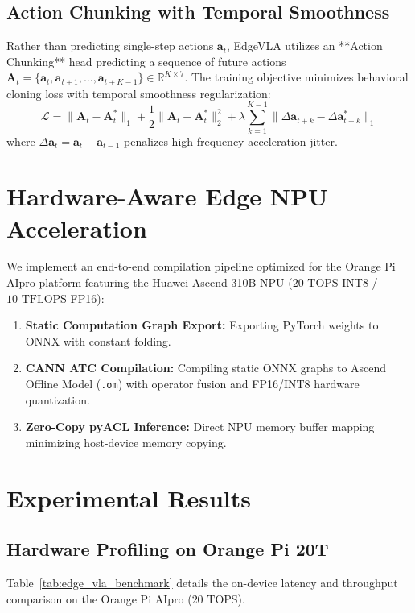 \documentclass[lettersize,journal]{IEEEtran}
\begin{document}
\subsection{Action Chunking with Temporal Smoothness}
Rather than predicting single-step actions $\mathbf{a}_t$, EdgeVLA utilizes an **Action Chunking** head predicting a sequence of future actions $\mathbf{A}_t = \{\mathbf{a}_t, \mathbf{a}_{t+1}, \dots, \mathbf{a}_{t+K-1}\} \in \mathbb{R}^{K \times 7}$. The training objective minimizes behavioral cloning loss with temporal smoothness regularization:
\begin{equation}
\mathcal{L} = \|\mathbf{A}_t - \mathbf{A}_t^*\|_1 + \frac{1}{2}\|\mathbf{A}_t - \mathbf{A}_t^*\|_2^2 + \lambda \sum_{k=1}^{K-1} \|\Delta \mathbf{a}_{t+k} - \Delta \mathbf{a}_{t+k}^*\|_1
\end{equation}
where $\Delta \mathbf{a}_t = \mathbf{a}_{t} - \mathbf{a}_{t-1}$ penalizes high-frequency acceleration jitter.

\section{Hardware-Aware Edge NPU Acceleration}
We implement an end-to-end compilation pipeline optimized for the Orange Pi AIpro platform featuring the Huawei Ascend 310B NPU ($20\text{ TOPS}$ INT8 / $10\text{ TFLOPS}$ FP16):
\begin{enumerate}
    \item \textbf{Static Computation Graph Export:} Exporting PyTorch weights to ONNX with constant folding.
    \item \textbf{CANN ATC Compilation:} Compiling static ONNX graphs to Ascend Offline Model (\texttt{.om}) with operator fusion and FP16/INT8 hardware quantization.
    \item \textbf{Zero-Copy pyACL Inference:} Direct NPU memory buffer mapping minimizing host-device memory copying.
\end{enumerate}

\section{Experimental Results}

\subsection{Hardware Profiling on Orange Pi 20T}
Table~\ref{tab:edge_vla_benchmark} details the on-device latency and throughput comparison on the Orange Pi AIpro ($20\text{ TOPS}$).
\end{document}
